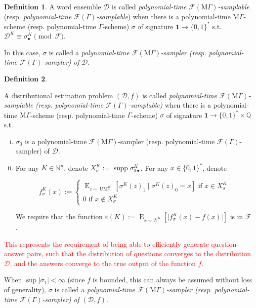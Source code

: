 \documentclass[11pt]{article}
\numberwithin{equation}{section}
\theoremstyle{definition}
\newtheorem{definition}{Definition}[section]
\theoremstyle{plain}
\newcommand{\Bool}{\{0,1\}}
\newcommand{\Words}{{\Bool^*}}
\DeclareMathOperator{\Supp}{supp}
\DeclareMathOperator{\E}{E}
\DeclareMathOperator{\UM}{UM}
\newcommand{\Nats}{\mathbb{N}}
\newcommand{\Rats}{\mathbb{Q}}
\newcommand{\Abs}[1]{\lvert #1 \rvert}
\newcommand{\Dist}{\mathcal{D}}
\newcommand{\MGrow}{\mathrm{M}\Gamma}
\newcommand{\Fall}{\mathcal{F}}
\newcommand{\EG}{\Fall(\Gamma)}
\newcommand{\EMG}{\Fall(\MGrow)}
\begin{document}
\begin{samepage}
\begin{definition}

A word ensemble $\Dist$ is called \emph{polynomial-time $\EMG$-samplable} (resp. \emph{polynomial-time $\EG$-samplable}) when there is a polynomial-time $\MGrow$-scheme (resp. polynomial-time $\Gamma$-scheme) $\sigma$ of signature ${\bm{1} \rightarrow \Words}$  s.t. $\Dist^{K} \equiv \sigma_\bullet^K \pmod \Fall$.

In this case, $\sigma$ is called a \emph{polynomial-time $\EMG$-sampler (resp. polynomial-time $\EG$-sampler) of $\Dist$}.

\end{definition}
\end{samepage}

\begin{samepage}
\begin{definition}
\label{def:smp_prob}

A distributional estimation problem $(\Dist,f)$ is called \emph{polynomial-time $\EMG$-samplable (resp. polynomial-time $\EG$-samplable)} when there is a polynomial-time $\MGrow$-scheme (resp. polynomial-time $\Gamma$-scheme) $\sigma$ of signature $\bm{1} \rightarrow \Words \times \Rats$ s.t. 

\begin{enumerate}[(i)]

\item $\sigma_0$ is a polynomial-time $\EMG$-sampler (resp. polynomial-time $\EG$-sampler) of $\Dist$.

\item For any $K \in \Nats^n$, denote $X_{\sigma}^K:=\Supp \sigma_{0\bullet}^K$. For any $x \in \Words$, denote 

$$f_\sigma^K(x):=\begin{cases}\E_{z \sim\UM_\sigma^K}[\sigma^K(z)_1 \mid \sigma^K(z)_0 = x] \text{ if } x \in X_{\sigma}^K \\ 0 \text{ if } x \not\in X_{\sigma}^K \end{cases}$$

We require that the function $\varepsilon(K):=\E_{x \sim \Dist^{K}}[\Abs{f_\sigma^K(x)-f(x)}]$ is in $\Fall$.

\end{enumerate}

\textcolor{red}{This represents the requirement of being able to efficiently generate question-answer pairs, such that the distribution of questions converges to the distribution $\Dist$, and the answers converge to the true output of the function $f$.}

When $\sup{\Abs{\sigma_1}} < \infty$ (since $f$ is bounded, this can always be assumed without loss of generality), $\sigma$ is called a \emph{polynomial-time $\EMG$-sampler (resp. polynomial-time $\EG$-sampler) of $(\Dist,f)$}.

\end{definition}
\end{samepage}
\end{document}
